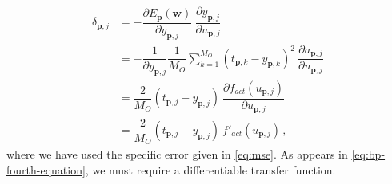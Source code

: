\documentclass[12pt, a4paper, twoside, openright, notitlepage]{report}
\numberwithin{equation}{chapter}
\theoremstyle{theorem}
\theoremstyle{definition}
\theoremstyle{remark}
\theoremstyle{proposition}
\numberwithin{figure}{chapter}
\begin{document}
		\begin{equation}
			\label{eq:bp-fourth-equation}
			\begin{aligned}
				\delta_{\mathbf{p},j} & = - \dfrac{\partial E_{\mathbf{p}}(\mathbf{w})}{\partial y_{\mathbf{p},j}} ~ \dfrac{\partial y_{\mathbf{p},j}}{\partial u_{\mathbf{p},j}} \\
				& = - \dfrac{1}{\partial y_{\mathbf{p},j}} \dfrac{1}{M_O} \sum_{k = 1}^{M_O} \left( t_{\mathbf{p},k} - y_{\mathbf{p},k} \right)^2 ~ \dfrac{\partial a_{\mathbf{p},j}}{\partial u_{\mathbf{p},j}} \\
				& = \dfrac{2}{M_O} \left( t_{\mathbf{p},j} - y_{\mathbf{p},j} \right) ~ \dfrac{\partial f_{act}(u_{\mathbf{p},j})}{\partial u_{\mathbf{p},j}} \\
				& = \dfrac{2}{M_O} \left( t_{\mathbf{p},j} - y_{\mathbf{p},j} \right) ~ f'_{act}(u_{\mathbf{p},j}) \, ,
			\end{aligned}
		\end{equation}
		where we have used the specific error given in \eqref{eq:mse}. As appears in \eqref{eq:bp-fourth-equation}, we must require a differentiable transfer function.
				
\end{document}

